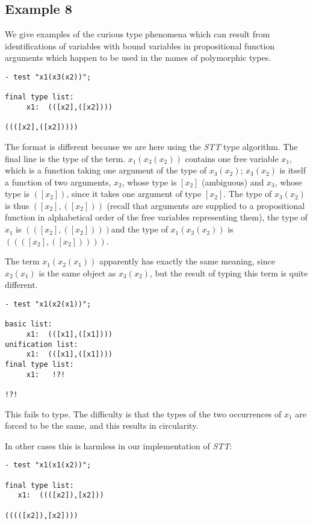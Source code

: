 \documentclass{article}
\begin{document}
\subsection{Example 8}
We give examples of the curious type phenomena which can result from
identifications of variables with bound variables in propositional
function arguments which happen to be used in the names of polymorphic
types.

\begin{verbatim}
- test "x1(x3(x2))";

final type list:
     x1:  (([x2],([x2])))

((([x2],([x2]))))
\end{verbatim}

The format is different because we are here using the {\em STT\/} type
algorithm.  The final line is the type of the term.  $x_1(x_3(x_2))$
contains one free variable $x_1$, which is a function taking one
argument of the type of $x_3(x_2)$; $x_3(x_2)$ is itself a function of
two arguments, $x_2$, whose type is $[x_2]$ (ambiguous) and $x_3$,
whose type is $([x_2])$, since it takes one argument of type $[x_2]$.
The type of $x_3(x_2)$ is thus $([x_2],([x_2]))$ (recall that
arguments are supplied to a propositional function in alphabetical
order of the free variables representing them), the type of $x_1$ is
$(([x_2],([x_2])))$and the type of $x_1(x_3(x_2))$ is
$((([x_2],([x_2]))))$.

The term $x_1(x_2(x_1))$ apparently has exactly the same meaning,
since $x_2(x_1)$ is the same object as $x_3(x_2)$, but the result of typing this term is quite different.

\begin{verbatim}
- test "x1(x2(x1))";

basic list:
     x1:  (([x1],([x1])))
unification list:
     x1:  (([x1],([x1])))
final type list:
     x1:   !?! 

!?! 
\end{verbatim}

This fails to type.  The difficulty is that the types of the two occurrences
of $x_1$ are forced to be the same, and this results in circularity.

In other cases this is harmless in our implementation of {\em STT\/}:

\begin{verbatim}
- test "x1(x1(x2))";

final type list:
   x1:  ((([x2]),[x2]))

(((([x2]),[x2])))
\end{verbatim}
\end{document}
